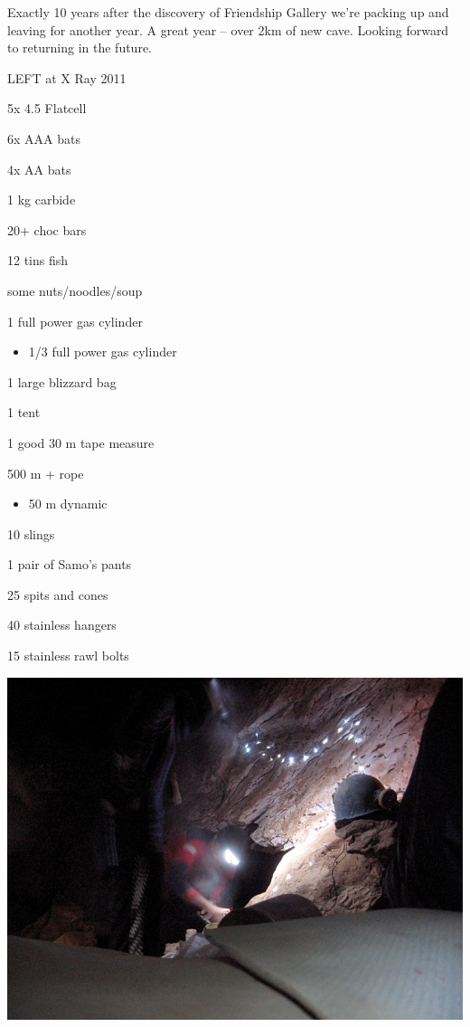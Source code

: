 Exactly 10 years after the discovery of Friendship Gallery we're packing
up and leaving for another year. A great year -- over 2km of new cave.
Looking forward to returning in the future.

LEFT at X Ray 2011

5x 4.5 Flatcell

6x AAA bats

4x AA bats

1 kg carbide

20+ choc bars

12 tins fish

some nuts/noodles/soup

1 full power gas cylinder

\begin{itemize}
\item
  1/3 full power gas cylinder
\end{itemize}

1 large blizzard bag

1 tent

1 good 30 m tape measure

500 m + rope

\begin{itemize}
\item
  50 m dynamic
\end{itemize}

10 slings

1 pair of Samo's pants

25 spits and cones

40 stainless hangers

15 stainless rawl bolts

\includegraphics{2011/ug_logbook/58.png}

